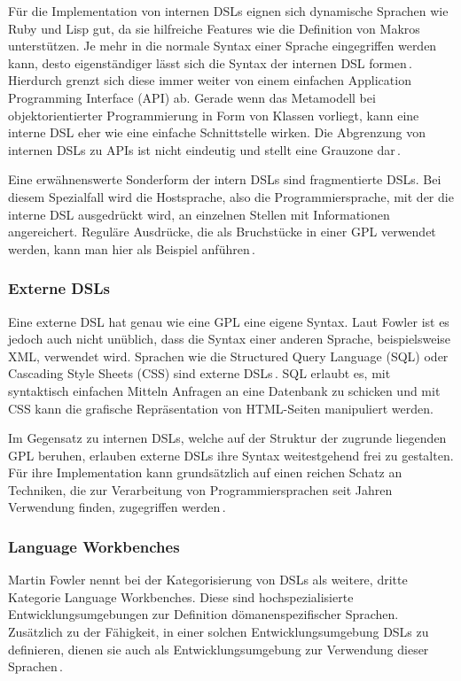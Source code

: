 \documentclass[12pt,oneside,a4paper,parskip]{scrbook}
\begin{document}
Für die Implementation von internen DSLs eignen sich dynamische Sprachen wie Ruby und Lisp gut, da sie hilfreiche Features wie die Definition von Makros unterstützen. Je mehr in die normale Syntax einer Sprache eingegriffen werden kann, desto eigenständiger lässt sich die Syntax der internen DSL formen\,\cite[S.\,98]{stahl2007}. Hierdurch grenzt sich diese immer weiter von einem einfachen Application Programming Interface (API) ab. Gerade wenn das Metamodell bei objektorientierter Programmierung in Form von Klassen vorliegt, kann eine interne DSL eher wie eine einfache Schnittstelle wirken. Die Abgrenzung von internen DSLs zu APIs ist nicht eindeutig und stellt eine Grauzone dar\,\cite[S.\,67]{fowler2010}.

Eine erwähnenswerte Sonderform der intern DSLs sind fragmentierte DSLs. Bei diesem Spezialfall wird die Hostsprache, also die Programmiersprache, mit der die interne DSL ausgedrückt wird, an einzelnen Stellen mit Informationen angereichert. Reguläre Ausdrücke, die als Bruchstücke in einer GPL verwendet werden, kann man hier als Beispiel anführen\,\cite[S.\,32]{fowler2010}.

\subsubsection{Externe DSLs}

Eine externe DSL hat genau wie eine GPL eine eigene Syntax. Laut Fowler ist es jedoch auch nicht unüblich, dass die Syntax einer anderen Sprache, beispielsweise XML, verwendet wird. Sprachen wie die Structured Query Language (SQL) oder Cascading Style Sheets (CSS) sind externe DSLs\,\cite[S.\,28]{fowler2010}. SQL erlaubt es, mit syntaktisch einfachen Mitteln Anfragen an eine Datenbank zu schicken und mit CSS kann die grafische Repräsentation von HTML-Seiten manipuliert werden.

Im Gegensatz zu internen DSLs, welche auf der Struktur der zugrunde liegenden GPL beruhen, erlauben externe DSLs ihre Syntax weitestgehend frei zu gestalten. Für ihre Implementation kann grundsätzlich auf einen reichen Schatz an Techniken, die zur Verarbeitung von Programmiersprachen seit Jahren Verwendung finden, zugegriffen werden\,\cite[S.\,89]{fowler2010}.

\subsubsection{Language Workbenches}

Martin Fowler nennt bei der Kategorisierung von DSLs als weitere, dritte Kategorie Language Workbenches. Diese sind hochspezialisierte Entwicklungsumgebungen zur Definition dömanenspezifischer Sprachen. Zusätzlich zu der Fähigkeit, in einer solchen Entwicklungsumgebung DSLs zu definieren, dienen sie auch als Entwicklungsumgebung zur Verwendung dieser Sprachen\,\cite[S.28]{fowler2010}.
\end{document}
